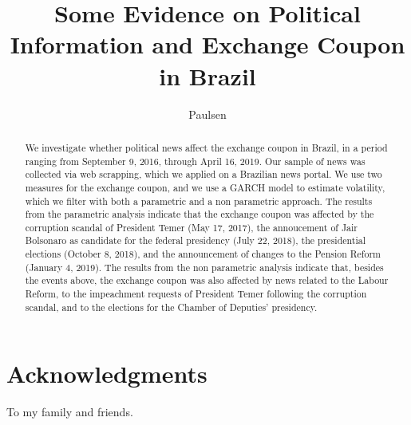 \documentclass[cic,tc, english]{iiufrgs}
\title{Some Evidence on Political Information and Exchange Coupon in Brazil}
\author{Paulsen}{Bernardo Hillesheim}
\begin{document}
\maketitle


\chapter*{Acknowledgments}

To my family and friends. %



\begin{abstract}
    We investigate whether political news affect the exchange coupon in Brazil, in a period ranging from September 9, 2016, through April 16, 2019. Our sample of news was collected via web scrapping, which we applied on a Brazilian news portal. We use two measures for the exchange coupon, and we use a GARCH model to estimate volatility, which we filter with both a parametric and a non parametric approach. The results from the parametric analysis indicate that the exchange coupon was affected by the corruption scandal of President Temer (May 17, 2017), the annoucement of Jair Bolsonaro as candidate for the federal presidency (July 22, 2018), the presidential elections (October 8, 2018), and the announcement of changes to the Pension Reform (January 4, 2019). The results from the non parametric analysis indicate that, besides the events above, the exchange coupon was also affected by news related to the Labour Reform, to the impeachment requests of President Temer following the corruption scandal, and to the elections for the Chamber of Deputies' presidency.
\end{abstract}



\listoffigures

\listoftables
\end{document}
